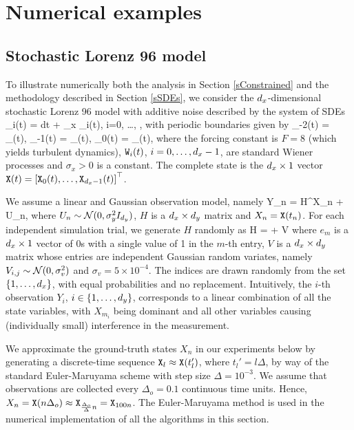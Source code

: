 \documentclass[onefignum,onetabnum]{siamonline250211}%
\begin{document}
\section{Numerical examples} \label{sNumerics}

%
\subsection{Stochastic Lorenz 96 model} 

To illustrate numerically both the analysis in Section \ref{sConstrained} and the methodology described in Section \ref{sSDEs}, we consider the $d_x$-dimensional stochastic Lorenz 96 model with additive noise \cite{Perez-Vieites18,Grudzien20} described by the system of SDEs
\beq
\sd \X_i(t) =  dt + \sigma_x  \sd \W_i(t), \quad i=0, \ldots, ,
\label{eqL96}
\eeq
with periodic boundaries given by 
\beq
\X_{-2}(t) = \X_{}(t),
\quad \X_{-1}(t) = \X_{}(t),
\quad  {} \quad  \X_0(t) = \X_{\dx}(t), 
\nn
\eeq
where the forcing constant is $F=8$ (which yields turbulent dynamics), $\mathtt{W}_i(t)$, $i=0, \ldots, d_x-1$, are standard Wiener processes and $\sigma_x>0$ is a constant. The complete state is the $d_x \times 1$ vector $\mathtt{X}(t)=\left[ \mathtt{X}_0(t), \ldots, \mathtt{X}_{d_x-1}(t) \right]^\top$. %

We assume a linear and Gaussian observation model, namely 
\beq
Y_n = H^\top X_n + U_n,
\label{eqObsEq}
\eeq
where $U_n \sim {\mathcal N}(0,\sigma_y^2 I_{d_y})$, $H$ is a $d_x \times d_y$ matrix and $X_n=\mathtt{X}(t_n)$. For each independent simulation trial, we generate $H$ randomly as
\beq
H =  + V 
\nn
\eeq
where $e_{m}$ is a $d_x \times 1$ vector of 0s with a single value of 1 in the $m$-th entry, $V$ is a $d_x \times d_y$ matrix whose entries are independent Gaussian random variates, namely $V_{i,j} \sim {\mathcal N}(0,\sigma_v^2)$ and $\sigma_v = 5 \times 10^{-4}$. The indices are drawn randomly from the set $\{1, \ldots, d_x\}$, with equal probabilities and no replacement. Intuitively, the $i$-th observation $Y_i$, $i\in\{1, \ldots, d_y\}$, corresponds to a linear combination of all the state variables, with $X_{m_i}$ being dominant and all other variables causing (individually small) interference in the measurement.
 
We approximate the ground-truth states $X_n$ in our experiments below by generating a discrete-time sequence $\mathtt{X}_l \approx \mathtt{X}(t_l')$, where $t_l'= l \Delta$, by way of the standard Euler-Maruyama scheme with step size $\Delta=10^{-3}$. We assume that observations are collected every $\Delta_o=0.1$ continuous time units. Hence, $X_n = \mathtt{X}(n\Delta_o) \approx \mathtt{X}_{\frac{\Delta_o}{\Delta}n} = \mathtt{X}_{100n}$. The Euler-Maruyama method is used in the numerical implementation of all the algorithms in this section.
\end{document}
